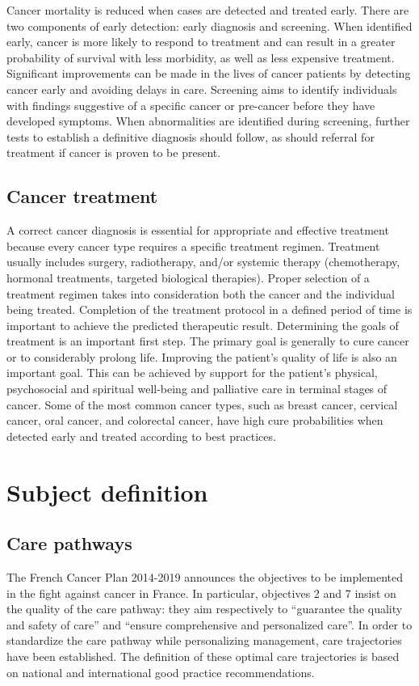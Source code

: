Cancer mortality is reduced when cases are detected and treated early. There are
two components of early detection: early diagnosis and screening. When
identified early, cancer is more likely to respond to treatment and can result
in a greater probability of survival with less morbidity, as well as less
expensive treatment. Significant improvements can be made in the lives of cancer
patients by detecting cancer early and avoiding delays in care. Screening aims
to identify individuals with findings suggestive of a specific cancer or
pre-cancer before they have developed symptoms. When abnormalities are
identified during screening, further tests to establish a definitive diagnosis
should follow, as should referral for treatment if cancer is proven to be
present.

\subsection{Cancer treatment}
A correct cancer diagnosis is essential for appropriate and effective treatment
because every cancer type requires a specific treatment regimen. Treatment
usually includes surgery, radiotherapy, and/or systemic therapy (chemotherapy,
hormonal treatments, targeted biological therapies). Proper selection of a
treatment regimen takes into consideration both the cancer and the individual
being treated. Completion of the treatment protocol in a defined period of time
is important to achieve the predicted therapeutic result. Determining the goals
of treatment is an important first step. The primary goal is generally to cure
cancer or to considerably prolong life. Improving the patient's quality of life
is also an important goal. This can be achieved by support for the patient's
physical, psychosocial and spiritual well-being and palliative care in terminal
stages of cancer. Some of the most common cancer types, such as breast cancer,
cervical cancer, oral cancer, and colorectal cancer, have high cure
probabilities when detected early and treated according to best practices.

\section{Subject definition}

\subsection{Care pathways}

The French Cancer Plan \cite{buzyn_plan_2014} 2014-2019 announces the objectives
to be implemented in the fight against cancer in France. In particular,
objectives 2 and 7 insist on the quality of the care pathway: they aim
respectively to ``guarantee the quality and safety of care'' and ``ensure
comprehensive and personalized care''. In order to standardize the care pathway
while personalizing management, care trajectories have been established. The
definition of these optimal care trajectories is based on national and
international good practice recommendations.

